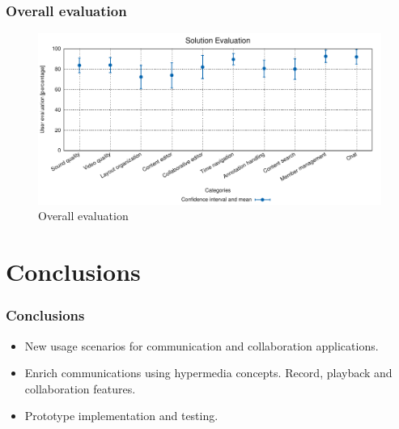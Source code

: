 \documentclass[compress]{beamer}
\begin{document}
	\begin{frame}[c]
		\frametitle{Overall evaluation}
		\begin{figure}[H]
			\includegraphics[width=\textwidth]{figures/user_evals.pdf}
			\caption{Overall evaluation}
		\end{figure}
	\end{frame}

\section{Conclusions}\label{concl} %

\begin{frame}[c]
		\frametitle{Conclusions}
		\begin{itemize}
\item New usage scenarios for communication and collaboration applications.
		\vfill

\item Enrich communications using hypermedia concepts. Record, playback and collaboration features.
		\vfill

\item Prototype implementation and testing.
		\end{itemize}

	\end{frame}
\end{document}
